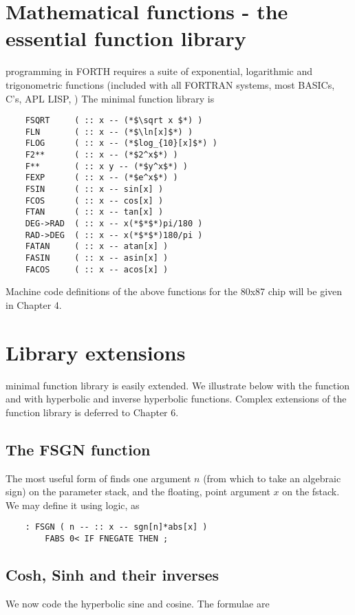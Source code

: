 \section{Mathematical functions - the essential function library}

 programming in FORTH requires a suite of exponential,
logarithmic and trigonometric functions (included with all
FORTRAN systems, most BASICs, C's, APL LISP, \etc) The
minimal function library is

\begin{lstlisting}
    FSQRT     ( :: x -- (*$\sqrt x $*) )
    FLN       ( :: x -- (*$\ln[x]$*) )
    FLOG      ( :: x -- (*$log_{10}[x]$*) )
    F2**      ( :: x -- (*$2^x$*) )
    F**       ( :: x y -- (*$y^x$*) )
    FEXP      ( :: x -- (*$e^x$*) )
    FSIN      ( :: x -- sin[x] )
    FCOS      ( :: x -- cos[x] )
    FTAN      ( :: x -- tan[x] )
    DEG->RAD  ( :: x -- x(*$*$*)pi/180 )
    RAD->DEG  ( :: x -- x(*$*$*)180/pi )
    FATAN     ( :: x -- atan[x] )
    FASIN     ( :: x -- asin[x] )
    FACOS     ( :: x -- acos[x] )
\end{lstlisting}

Machine code definitions of the above functions for the 80x87
chip will be given in Chapter 4.

\section{Library extensions}

 minimal function library is easily extended. We illustrate
below with the  function and with hyperbolic and inverse hyperbolic
functions. Complex extensions of the function
library is deferred to Chapter 6.

\subsection{The FSGN function}
The most useful form of  finds one argument $n$ (from which
to take an algebraic sign) on the parameter stack, and the floating,
point argument $x$ on the fstack. We may define it using logic, as

\begin{lstlisting}
    : FSGN ( n -- :: x -- sgn[n]*abs[x] )
        FABS 0< IF FNEGATE THEN ;
\end{lstlisting}

\subsection{Cosh, Sinh and their inverses}
We now code the hyperbolic sine and cosine. The formulae are

